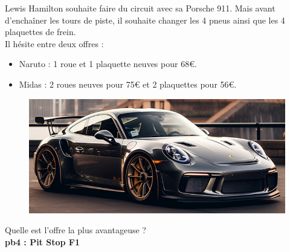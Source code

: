 \begin{multicols}{2} 
  Lewis Hamilton souhaite faire du circuit avec sa Porsche 911. Mais avant d'enchaîner les tours de piste, il souhaite changer les 4 pneus ainsi que les 4 plaquettes de frein. \\

  Il hésite entre deux offres : 

  \begin{itemize}[label={$\bullet$}]
    \item Naruto : 1 roue et 1 plaquette neuves pour 68€.
    \item Midas : 2 roues neuves pour 75€ et 2 plaquettes pour 56€. 
  \end{itemize} \columnbreak

  \begin{figure}[H]
    \centering
    \includegraphics[width=0.9\linewidth]{5x2-inegalite-triangulaire/porsche.png}
  \end{figure} 
\end{multicols}

Quelle est l'offre la plus avantageuse ?\\

\textbf{pb4 : Pit Stop F1} \\

